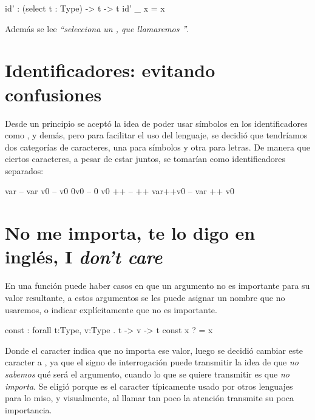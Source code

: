 {\begin{designfr}
\begin{anglercode}
id' : (select t : Type) -> t -> t
id' _ x = x
\end{anglercode}

Además se lee \emph{\enquote{selecciona un , que llamaremos }}.
\end{designfr}

\section{Identificadores: evitando confusiones}

\begin{designfr}
Desde un principio se aceptó la idea de poder usar símbolos en los identificadores como \inlinecode{+}, \inlinecode{*} y demás, pero para facilitar el uso del lenguaje, se decidió que tendríamos dos categorías de caracteres, una para símbolos y otra para letras. De manera que ciertos caracteres, a pesar de estar juntos, se tomarían como identificadores separados:

\begin{anglercode}
var         -- var
v0          -- v0
0v0         -- 0 v0
++          -- ++
var++v0     -- var ++ v0
\end{anglercode}
\end{designfr}

\section{No me importa, te lo digo en inglés, I \emph{don't care}}

\begin{designfr}
En una función puede haber casos en que un argumento no es importante para su valor resultante, a estos argumentos se les puede asignar un nombre que no usaremos, o indicar explícitamente que no es importante.

\begin{anglercode}
const : forall t:Type, v:Type . t -> v -> t
const x ? = x
\end{anglercode}

Donde el caracter  indica que no importa ese valor, luego se decidió cambiar este caracter a \inlinecode{\_}, ya que el signo de interrogación puede transmitir la idea de que \emph{no sabemos} qué será el argumento, cuando lo que se quiere transmitir es que \emph{no importa}. Se eligió \inlinecode{\_} porque es el caracter típicamente usado por otros lenguajes para lo miso, y visualmente, al llamar tan poco la atención transmite su poca importancia.


\end{designfr}}
